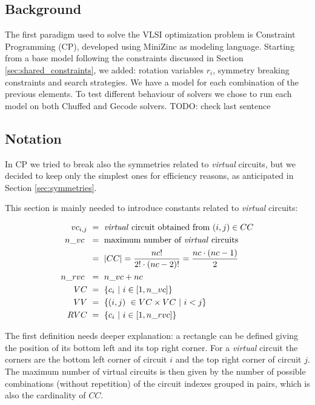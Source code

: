 
\subsection{Background}
The first paradigm used to solve the VLSI optimization problem is Constraint Programming (CP),
developed using MiniZinc as modeling language.
Starting from a base model following the constraints discussed in Section \ref{sec:shared_constraints},
we added: rotation variables $r_i$, symmetry breaking constraints and search strategies. We have a model
for each combination of the previous elements.
To test different behaviour of solvers we chose to run each model on both Chuffed and Gecode solvers.
\colorbox{BurntOrange}{TODO: check last sentence}


\subsection{Notation} \label{sec:CP_notation}
In CP we tried to break also the symmetries related to \textit{virtual} circuits, but we decided to
keep only the simplest ones for efficiency reasons, as anticipated in Section \ref{sec:symmetries}.

This section is mainly needed to introduce constants related to \textit{virtual} circuits:

\begin{align*}
  vc_{i,j} & \ =\ \text{\textit{virtual} circuit obtained from  } (i,j) \in CC      \\
  n\_vc\   & \ =\ \text{maximum number of \textit{virtual} circuits}                \\
           & \ =\ |CC| = \frac{nc!}{2! \cdot (nc - 2)!} = \frac{nc \cdot (nc-1)}{2} \\
  n\_rvc\  & \ =\ n\_vc + nc                                                        \\
  VC       & \ =\ \{ c_i\ |\ i \in [1,n\_vc] \}                                     \\
  VV       & \ =\ \{ (i,j)\ \in VC \times VC\ |\ i <j \}                            \\
  RVC      & \ =\ \{ c_i\ |\ i \in [1,n\_rvc] \}                                    \\
\end{align*}

The first definition needs deeper explanation: a rectangle can be defined giving the position
of its bottom left and its top right corner. For a \textit{virtual} circuit the corners are the
bottom left corner of circuit $i$ and the top right corner of circuit $j$.
The maximum number of virtual circuits is then given by the number of possible combinations
(without repetition) of the circuit indexes grouped in pairs, which is also the cardinality of $CC$.



